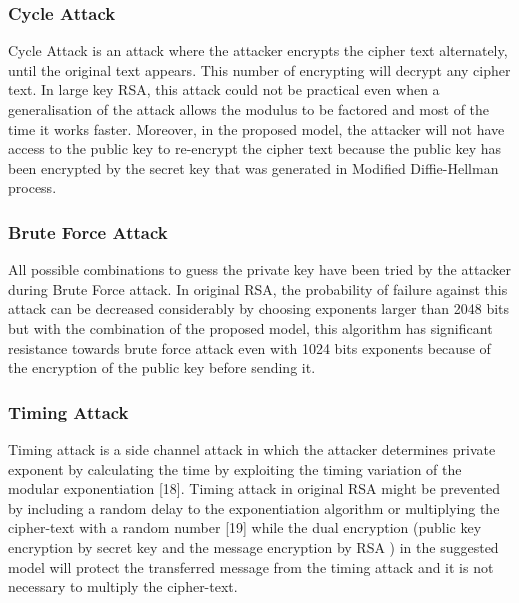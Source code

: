 \subsubsection{Cycle Attack }
Cycle Attack is an attack where the attacker encrypts the
cipher text alternately, until the original text appears. This
number of encrypting will decrypt any cipher text. In large key
RSA, this attack could not be practical even when a
generalisation of the attack allows the modulus to be factored
and most of the time it works faster. Moreover, in the
proposed model, the attacker will not have access to the public
key to re-encrypt the cipher text because the public key has
been encrypted by the secret key that was generated in
Modified Diffie-Hellman process.

\subsubsection{Brute Force Attack}
All possible combinations to guess the private key have
been tried by the attacker during Brute Force attack. In
original RSA, the probability of failure against this attack can
be decreased considerably by choosing exponents larger than
2048 bits but with the combination of the proposed model, this
algorithm has significant resistance towards brute force attack
even with 1024 bits exponents because of the encryption of
the public key before sending it.

\subsubsection{Timing Attack}
Timing attack is a side channel attack in which the attacker
determines private exponent by calculating the time by
exploiting the timing variation of the modular exponentiation
	[18]. Timing attack in original RSA might be prevented by
including a random delay to the exponentiation algorithm or
multiplying the cipher-text with a random number [19] while
the dual encryption (public key encryption by secret key and
the message encryption by RSA ) in the suggested model
will protect the transferred message from the timing attack and
it is not necessary to multiply the cipher-text.

\pagebreak
